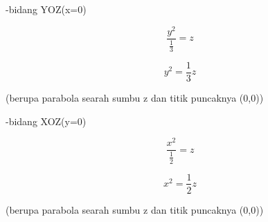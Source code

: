 \documentclass[12pt,arial,letterpaper]{book}
\begin{document}
\begin{eulercomment}
\begin{eulercomment}
\begin{eulercomment}
\begin{eulercomment}
\begin{eulercomment}
\begin{eulercomment}
\begin{eulercomment}
\begin{eulercomment}
\begin{eulercomment}
\begin{eulercomment}
\begin{eulercomment}
\begin{eulercomment}
\begin{eulercomment}
\begin{eulercomment}
\begin{eulercomment}
\begin{eulercomment}
\begin{eulercomment}
\begin{eulercomment}
\begin{eulercomment}
-bidang YOZ(x=0)\\
\end{eulercomment}
\begin{eulerformula}
\[
\frac{y^2}{\frac{1}{3}}=z
\]
\end{eulerformula}
\begin{eulerformula}
\[
y^2={\frac{1}{3}}z
\]
\end{eulerformula}
\begin{eulercomment}
(berupa parabola searah sumbu z dan titik puncaknya (0,0))

-bidang XOZ(y=0)\\
\end{eulercomment}
\begin{eulerformula}
\[
\frac{x^2}{\frac{1}{2}}=z
\]
\end{eulerformula}
\begin{eulerformula}
\[
x^2={\frac{1}{2}}z
\]
\end{eulerformula}
\begin{eulercomment}
(berupa parabola searah sumbu z dan titik puncaknya (0,0))


\end{eulercomment}
\end{eulercomment}
\end{eulercomment}
\end{eulercomment}
\end{eulercomment}
\end{eulercomment}
\end{eulercomment}
\end{eulercomment}
\end{eulercomment}
\end{eulercomment}
\end{eulercomment}
\end{eulercomment}
\end{eulercomment}
\end{eulercomment}
\end{eulercomment}
\end{eulercomment}
\end{eulercomment}
\end{eulercomment}
\end{eulercomment}
\end{document}
